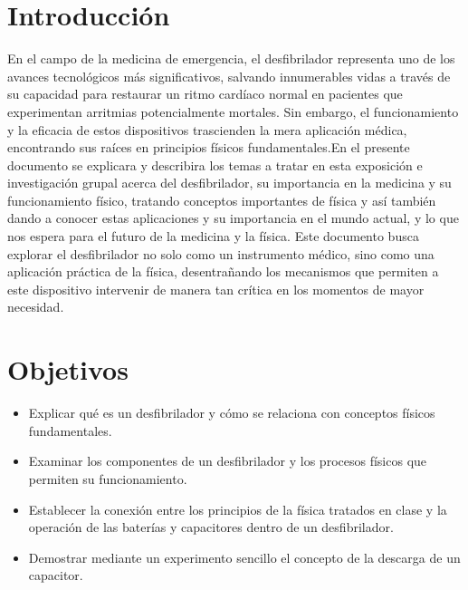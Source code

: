 \section{Introducción}

En el campo de la medicina de emergencia, el desfibrilador representa uno de los avances tecnológicos más significativos, salvando innumerables vidas a través de su capacidad para restaurar un ritmo cardíaco normal en pacientes que experimentan arritmias potencialmente mortales. Sin embargo, el funcionamiento y la eficacia de estos dispositivos trascienden la mera aplicación médica, encontrando sus raíces en principios físicos fundamentales.En el presente documento se explicara y describira los temas a tratar en esta exposición e investigación grupal acerca del desfibrilador, su importancia en la medicina y su funcionamiento físico, tratando conceptos importantes de física y así también dando a conocer estas aplicaciones y su importancia en el mundo actual, y lo que nos espera para el futuro de la medicina y la física. Este documento busca explorar el desfibrilador no solo como un instrumento médico, sino como una aplicación práctica de la física, desentrañando los mecanismos que permiten a este dispositivo intervenir de manera tan crítica en los momentos de mayor necesidad.

\section{Objetivos}

\begin{itemize}
    \item Explicar qué es un desfibrilador y cómo se relaciona con conceptos físicos fundamentales.
    \item Examinar los componentes de un desfibrilador y los procesos físicos que permiten su funcionamiento.
    \item Establecer la conexión entre los principios de la física tratados en clase y la operación de las baterías y capacitores dentro de un desfibrilador.
    \item Demostrar mediante un experimento sencillo el concepto de la descarga de un capacitor.
\end{itemize}

